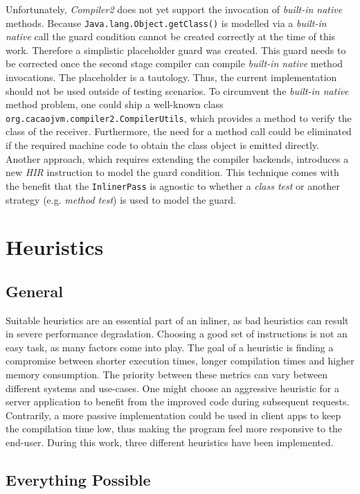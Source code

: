 \documentclass[draft, final]{vutinfth} %
\begin{document}
Unfortunately, \emph{Compiler2} does not yet support the invocation of \emph{built-in native} methods. Because \texttt{Java.lang.Object.getClass()} is modelled via a \emph{built-in native} call the guard condition cannot be created correctly at the time of this work. Therefore a simplistic placeholder guard was created. This guard needs to be corrected once the second stage compiler can compile \emph{built-in native}
method invocations. The placeholder is a tautology. Thus, the current implementation should not be used outside of testing scenarios. To circumvent the \emph{built-in native} method problem, one could ship a well-known class \texttt{org.cacaojvm.compiler2.CompilerUtils}, which provides a method to verify the class of the receiver. Furthermore, the need for a method call could be eliminated if the required machine code to obtain the class object is emitted directly. Another approach, which requires extending the compiler backends, introduces a new \emph{HIR} instruction to model the guard condition. This technique comes with the benefit that the \texttt{InlinerPass} is agnostic to whether a \emph{class test} or another strategy (e.g. \emph{method test}) is used to model the guard.

\section{Heuristics}
\label{sec:heuristics}
\subsection{General}

Suitable heuristics are an essential part of an inliner\cite{Prokopec19}, as bad heuristics can result in severe performance degradation. Choosing a good set of instructions is not an easy task, as many factors come into play. The goal of a heuristic is finding a compromise between shorter execution times, longer compilation times and higher memory consumption. The priority between these metrics can vary between different systems and use-cases. One might choose an aggressive heuristic for a server application to benefit from the improved code during subsequent requests. Contrarily, a more passive implementation could be used in client apps to keep the compilation time low, thus making the program feel more responsive to the end-user. During this work, three different heuristics have been implemented.

\subsection{Everything Possible}
\end{document}
